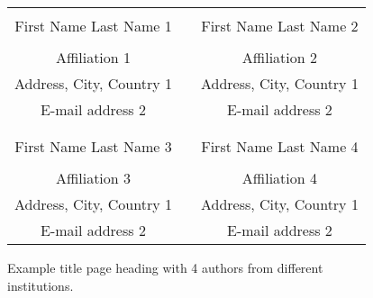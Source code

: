 \documentclass{scspaperproc}
\theoremstyle{scsthe}
\begin{document}
\begin{figure*}[htb]
{
\centering
\begin{tabular}{ccc}
\phantom{Adjust spacing using these entries} & \phantom{intermediate space} & \phantom{Adjust spacing using these entries} \\
First Name Last Name 1 & & First Name Last Name 2 \\
\\
Affiliation 1 & & Affiliation 2 \\
Address, City, Country 1 & & Address, City, Country 1 \\
E-mail address 2 & & E-mail address 2 \\
\\ \\
First Name Last Name 3 & & First Name Last Name 4 \\
\\
Affiliation 3 & & Affiliation 4 \\
Address, City, Country 1 & & Address, City, Country 1 \\
E-mail address 2 & & E-mail address 2 
\end{tabular}
\caption{Example title page heading with 4 authors from different institutions.\label{fig4different}}
}
\end{figure*}
\end{document}
